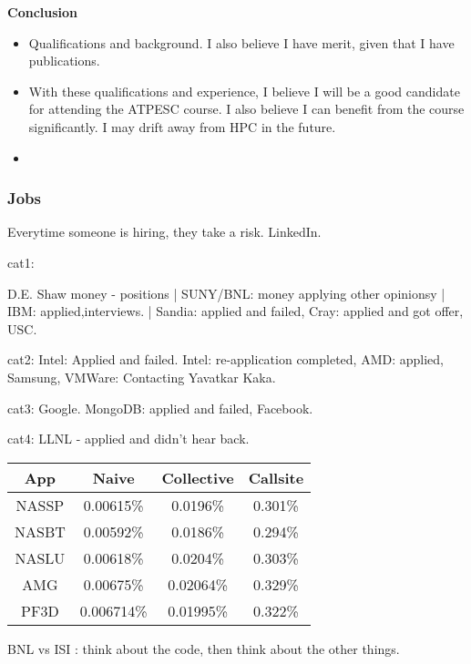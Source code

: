 \begin{frame}[label = atpesc]
\textbf{Conclusion} 
\begin{itemize}  
\tiny \item \tiny Qualifications and background. I also believe I have
merit, given that I have publications.  
\item \tiny With these qualifications and experience, I believe I will
  be a good candidate for attending the ATPESC course. I also believe
  I can benefit from the course significantly. I may drift away from
  HPC in the future. 
\item \tiny  
\end{itemize} 
\end{frame} 


\begin{frame} 
\frametitle{Jobs}
{\tiny Everytime someone is hiring, they take a risk. LinkedIn. }
\begin{table}
\begin{tabular} 
cat1: 

D.E. Shaw money - positions | SUNY/BNL: money  applying other opinionsy | IBM: applied,interviews.  | Sandia:
applied and failed, Cray: applied and got offer, USC. 
 
cat2: 
  Intel: Applied and failed. Intel: re-application completed, AMD:
  applied, Samsung, VMWare: Contacting Yavatkar Kaka. 

cat3: 
  Google. MongoDB: applied and failed, Facebook.

cat4: LLNL - applied and didn't hear back.   

\end{tabular} 
\end{table} 

\begin{table} 
\begin{tabular}{ | c || c | c | c |}
  \hline
   \textbf{App} &  \textbf{Naive} &  \textbf{Collective} & \textbf{Callsite} \\
  \hline
  \tiny NASSP & \tiny 0.00615\%  & \tiny 0.0196\% & \tiny 0.301\% \\
  \hline
   NASBT & \tiny 0.00592\% & 0.0186\% & \tiny 0.294\% \\
  \hline
   NASLU & \tiny 0.00618\% &  \tiny 0.0204\% & \tiny 0.303\%  \\
  \hline
  \tiny AMG & \tiny 0.00675\% & \tiny 0.02064\% & \tiny 0.329\%  \\
  \hline
  \tiny PF3D & \tiny 0.006714\%  & \tiny 0.01995\% & \tiny 0.322\% \\
  \hline
\end{tabular}
\end{table} 

{\tiny BNL vs ISI :  think about the code, then think about the other
  things.} 
\end{frame} 

